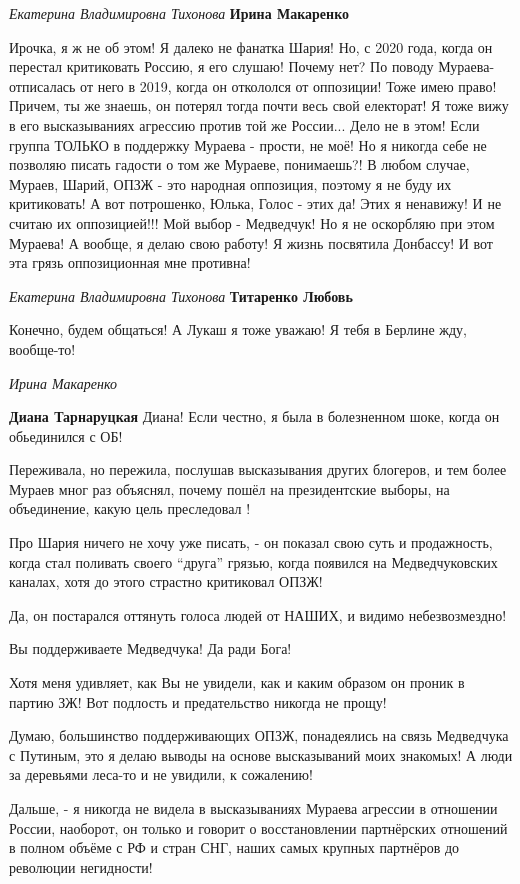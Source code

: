 \emph{Екатерина Владимировна Тихонова}
\textbf{Ирина Макаренко}

Ирочка, я ж не об этом! Я далеко не фанатка Шария! Но, с 2020 года, когда он
перестал критиковать Россию, я его слушаю! Почему нет? По поводу Мураева-
отписалась от него в 2019, когда он откололся от оппозиции! Тоже имею право!
Причем, ты же знаешь, он потерял тогда почти весь свой електорат! Я тоже вижу в
его высказываниях агрессию против той же России... Дело не в этом! Если группа
ТОЛЬКО в поддержку Мураева - прости, не моё! Но я никогда себе не позволяю
писать гадости о том же Мураеве, понимаешь?! В любом случае, Мураев, Шарий,
ОПЗЖ - это народная оппозиция, поэтому я не буду их критиковать! А вот
потрошенко, Юлька, Голос - этих да! Этих я ненавижу! И не считаю их
оппозицией!!! Мой выбор - Медведчук! Но я не оскорбляю при этом Мураева! А
вообще, я делаю свою работу! Я жизнь посвятила Донбассу! И вот эта грязь
оппозиционная мне противна!

\emph{Екатерина Владимировна Тихонова}
\textbf{Титаренко Любовь}

Конечно, будем общаться! А Лукаш я тоже уважаю! Я тебя в Берлине жду,
вообще-то!

\emph{Ирина Макаренко}

\textbf{Диана Тарнаруцкая} Диана! Если честно, я была в болезненном шоке, когда он обьединился с ОБ!

Переживала, но пережила, послушав высказывания других блогеров, и тем более
Мураев мног раз объяснял, почему пошёл на президентские выборы, на объединение,
какую цель преследовал !

Про Шария ничего не хочу уже писать, - он показал свою суть и продажность,
когда стал поливать своего \enquote{друга} грязью, когда появился на Медведчуковских
каналах, хотя до этого страстно критиковал ОПЗЖ!

Да, он постарался оттянуть голоса людей от НАШИХ, и видимо небезвозмездно!

Вы поддерживаете Медведчука! Да ради Бога!

Хотя меня удивляет, как Вы не увидели, как и каким образом он проник в партию ЗЖ! Вот подлость и предательство никогда не прощу!

Думаю, большинство поддерживающих ОПЗЖ, понадеялись на связь Медведчука с
Путиным, это я делаю выводы на основе высказываний моих знакомых! А люди за
деревьями леса-то и не увидили, к сожалению!

Дальше, - я никогда не видела в высказываниях Мураева агрессии в отношении
России, наоборот, он только и говорит о восстановлении партнёрских отношений в
полном объёме с РФ и стран СНГ, наших самых крупных партнёров до революции
негидности!

